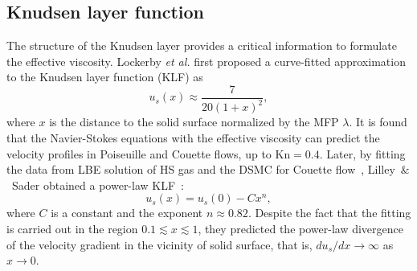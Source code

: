 



\subsection{Knudsen layer function }\label{sec:knudsenlayer}
%




The structure of the Knudsen layer provides a critical information to formulate the effective viscosity. Lockerby \textit{et al.} first proposed a curve-fitted approximation to the Knudsen layer function (KLF) as~\cite{lockerby2005capturing}
\begin{equation}\label{eq:loc_vis}
u_s\left(x\right)\approx\frac{7}{20(1+x)^2},
\end{equation}
where $x$ is the distance to the solid surface normalized by the MFP $\lambda$. It is found that the Navier-Stokes equations with the effective viscosity can predict the velocity profiles in Poiseuille and Couette flows, up to $\text{Kn}=0.4$. Later, by fitting the data from LBE solution of HS gas and the DSMC for Couette flow~\cite{ohwada1989numerical}, Lilley~$\&$~Sader obtained a power-law KLF~\cite{lilley2007velocity,lilley2008velocity}:
\begin{equation}
u_s\left(x\right)=u_s(0)-Cx^n,
\end{equation}
where $C$ is a constant and the exponent $n\approx0.82$. Despite the fact that the fitting is carried out in the region $0.1{\lesssim}x\lesssim1$, they predicted the power-law divergence of the velocity gradient in the vicinity of solid surface, that is, $du_s/dx\rightarrow\infty$ as $x\rightarrow0$.


